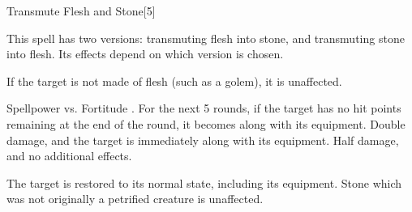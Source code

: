 \begin{spellsection}{Transmute Flesh and Stone}[5]
    \begin{spellheader}
    \end{spellheader}
    \begin{spellcontent}
        \begin{spelltargetinginfo}
            \spellspecial This spell has two versions: transmuting flesh into stone, and transmuting stone into flesh. Its effects depend on which version is chosen.
        \end{spelltargetinginfo}
    \end{spellcontent}
    \begin{spellsubcontent}
        \begin{spelltargetinginfo}
        \end{spelltargetinginfo}
        \begin{spelleffects}
            \spellspecial If the target is not made of flesh (such as a golem), it is unaffected.
            \begin{spellattack}{Spellpower vs. Fortitude}
                \spellsuccess {}. For the next 5 rounds, if the target has no hit points remaining at the end of the round, it becomes \petrified along with its equipment.
                \spellcritical Double damage, and the target is immediately \petrified along with its equipment.
                \spellfailure Half damage, and no additional effects.
            \end{spellattack}
        \end{spelleffects}
    \end{spellsubcontent}
    \begin{spellsubcontent}
        \begin{spelltargetinginfo}
        \end{spelltargetinginfo}
        \begin{spelleffects}
            \spelleffect The target is restored to its normal state, including its equipment. Stone which was not originally a petrified creature is unaffected.
        \end{spelleffects}
    \end{spellsubcontent}
    \begin{spellfooter}
        \miscastrandom
    \end{spellfooter}
    \begin{spellaugments}
    \end{spellaugments}
\end{spellsection}

